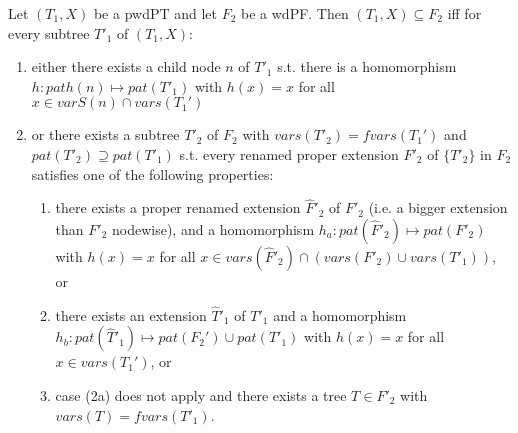 \begin{theorem}\label{projwd3}
	Let $(T_1,X)$ be a pwdPT and let $F_2$ be a wdPF. Then $(T_1,X) \subseteq
	F_2$ iff for every subtree $T'_1$ of $(T_1,X)$:
	\begin{enumerate}
		\item either there exists a child node $n$ of $T'_1$ s.t. there is a
			homomorphism $h: path(n) \mapsto pat(T'_1)$ with $h(x) = x$ for
			all $x \in varS(n) \cap vars(T_1')$
		\item or there exists a subtree $T'_2$ of $F_2$ with $vars(T'_2) =
			fvars(T_1')$ and $pat(T'_2) \supseteq pat(T'_1)$ s.t. every
			renamed proper extension $F'_2$ of $\{T'_2\}$ in $F_2$ satisfies one
			of the following properties:
			\begin{enumerate}
				\item \label{firstcaseprojwd3}there exists a proper renamed extension $\hat{F}'_2$ of
					$F'_2$ (i.e. a bigger extension than $F'_2$ nodewise),
					and a homomorphism $h_a: pat(\hat{F}'_2) \mapsto
					pat(F'_2)$ with $h(x) = x$ for all $x \in
					vars(\hat{F}'_2)\cap (vars(F'_2) \cup vars(T'_1))$, or
				\item there exists an extension $\hat{T}'_1$ of $T'_1$ and a
					homomorphism $h_b: pat(\hat{T}'_1) \mapsto pat(F_2') \cup
					pat(T'_1)$ with $h(x) =x$ for all $x \in vars(T_1')$, or
				\item case (2a) does not apply and there
					exists a tree $T \in F'_2$ with $vars(T)= fvars(T'_1)$.
			\end{enumerate}
	\end{enumerate}
\end{theorem}

